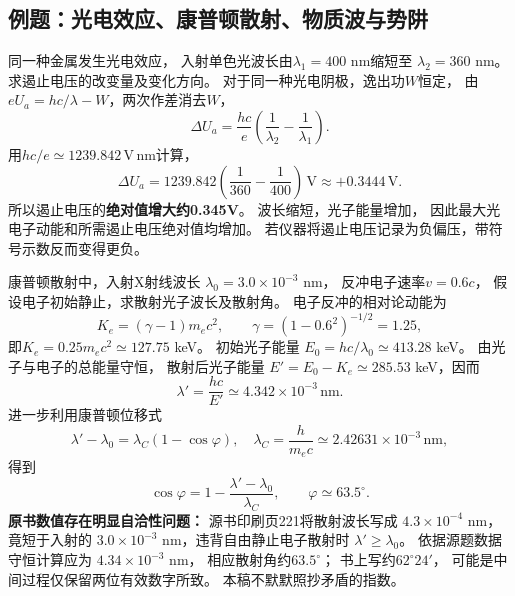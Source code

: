 \subsection{例题：光电效应、康普顿散射、物质波与势阱}

\problemtext 同一种金属发生光电效应，
入射单色光波长由$\lambda_1=400$ nm缩短至
$\lambda_2=360$ nm。
求遏止电压的改变量及变化方向。
\workings
对于同一种光电阴极，逸出功$W$恒定，
由$eU_a=hc/\lambda-W$，两次作差消去$W$，
\[
 \Delta U_a=\frac{hc}{e}\left(\frac1{\lambda_2}
                  -\frac1{\lambda_1}\right).
\]
用$hc/e\simeq1239.842\,\mathrm{V\,nm}$计算，
\[
 \boxed{\Delta U_a=
 1239.842\left(\frac1{360}-\frac1{400}\right)
 \,\mathrm V\approx+0.3444\,\mathrm V}.
\]
所以遏止电压的\textbf{绝对值增大约0.345V}。
\crosscheck 波长缩短，光子能量增加，
因此最大光电子动能和所需遏止电压绝对值均增加。
若仪器将遏止电压记录为负偏压，带符号示数反而变得更负。

\problemtext 康普顿散射中，入射X射线波长
$\lambda_0=3.0\times10^{-3}$ nm，
反冲电子速率$v=0.6c$，
假设电子初始静止，求散射光子波长及散射角。
\workings
电子反冲的相对论动能为
\[
 K_e=(\gamma-1)m_ec^2,\qquad
 \gamma=(1-0.6^2)^{-1/2}=1.25,
\]
即$K_e=0.25m_ec^2\simeq127.75$ keV。
初始光子能量
$E_0=hc/\lambda_0\simeq413.28$ keV。
由光子与电子的总能量守恒，
散射后光子能量
$E'=E_0-K_e\simeq285.53$ keV，因而
\[
 \boxed{\lambda'=\frac{hc}{E'}
 \simeq4.342\times10^{-3}\,\mathrm{nm}}.
\]
进一步利用康普顿位移式
\[
 \lambda'-\lambda_0
 =\lambda_C(1-\cos\varphi),\quad
 \lambda_C=\frac{h}{m_ec}\simeq2.42631\times10^{-3}\,\mathrm{nm},
\]
得到
\[
 \boxed{\cos\varphi
 =1-\frac{\lambda'-\lambda_0}{\lambda_C}},
 \qquad
 \boxed{\varphi\simeq63.5^\circ}.
\]
\crosscheck \textbf{原书数值存在明显自洽性问题：}
源书印刷页221将散射波长写成
$4.3\times10^{-4}$ nm，竟短于入射的
$3.0\times10^{-3}$ nm，违背自由静止电子散射时
$\lambda'\ge\lambda_0$。
依据源题数据守恒计算应为
$4.34\times10^{-3}$ nm，
相应散射角约$63.5^\circ$；
书上写约$62^\circ24'$，
可能是中间过程仅保留两位有效数字所致。
本稿不默默照抄矛盾的指数。

